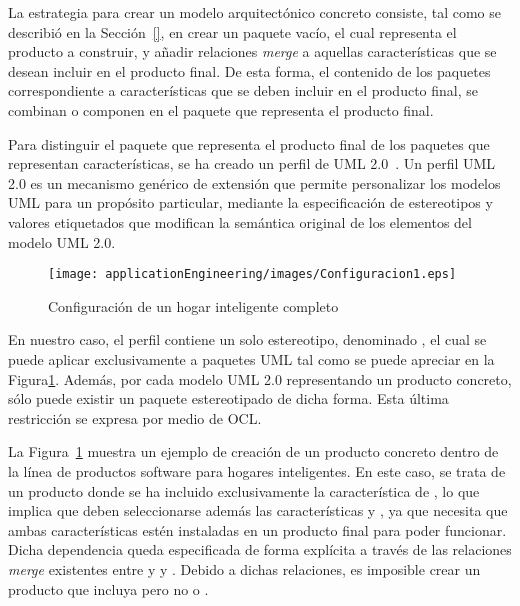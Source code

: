 
La estrategia para crear un modelo arquitectónico concreto consiste, tal como se describió en la Sección~\ref{}, en crear un paquete vacío, el cual representa el producto a construir, y añadir relaciones \emph{merge} a aquellas características que se desean incluir en el producto final. De esta forma, el contenido de los paquetes correspondiente a características que se deben incluir en el producto final, se combinan o componen en el paquete que representa el producto final.

Para distinguir el paquete que representa el producto final de los paquetes que representan características, se ha creado un perfil de UML 2.0~\citep{omg:uml:2005}. Un perfil UML 2.0 es un mecanismo genérico de extensión que permite personalizar los modelos UML para un propósito particular, mediante la especificación de estereotipos y valores etiquetados que modifican la semántica original de los elementos del modelo UML 2.0.

\begin{figure}[!tb]
  \center
  \texttt{[image: applicationEngineering/images/Configuracion1.eps]} \\
  \caption{Configuración de un hogar inteligente completo}
  \label{app:fig:conf1}
\end{figure}

En nuestro caso, el perfil contiene un solo estereotipo, denominado , el cual se puede aplicar exclusivamente a paquetes UML tal como se puede apreciar en la Figura\ref{app:fig:conf1}. Además, por cada modelo UML 2.0 representando un producto concreto, sólo puede existir un paquete estereotipado de dicha forma. Esta última restricción se expresa por medio de OCL.

La Figura~\ref{app:fig:conf1} muestra un ejemplo de creación de un producto concreto dentro de la línea de productos software para hogares inteligentes. En este caso, se trata de un producto donde se ha incluido exclusivamente la característica de , lo que implica que deben seleccionarse además las características  y , ya que  necesita que ambas características estén instaladas en un producto final para poder funcionar. Dicha dependencia queda especificada de forma explícita a través de las relaciones \emph{merge} existentes entre  y  y . Debido a dichas relaciones, es imposible crear un producto que incluya  pero no  o .

